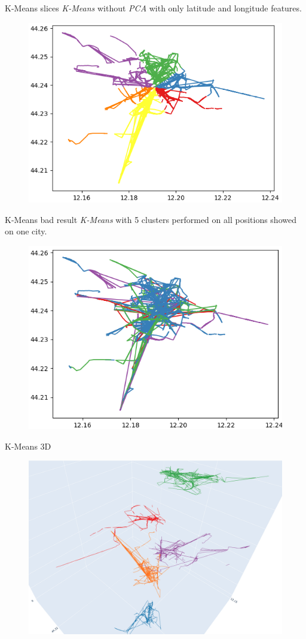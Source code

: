 \documentclass{beamer}
\begin{document}
\begin{frame}{K-Means slices}
\textit{K-Means} without \textit{PCA} with only latitude and longitude features.
\begin{figure}[bt]
	\centering
	\includegraphics[width=0.80\columnwidth]{kmeans-without-pca}
	\label{fig:kmeans-without-pca}
\end{figure}
\end{frame}

\begin{frame}{K-Means bad result}
\textit{K-Means} with 5 clusters performed on all positions showed on one city.
\begin{figure}[bt]
	\centering
	\includegraphics[width=0.80\columnwidth]{kmeans-bad}
	\label{fig:kmeans-bad}
\end{figure}
\end{frame}

\begin{frame}{K-Means 3D}
\begin{figure}[bt]
	\centering
	\includegraphics[width=\columnwidth]{kmeans-3d}
	\label{fig:kmeans-3d}
\end{figure}
\end{frame}
\end{document}
